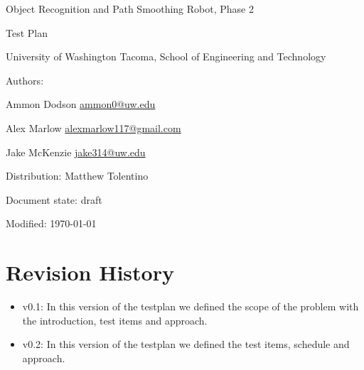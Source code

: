 \documentclass[english,12pt]{article}
\begin{document}
\begin{center}

\thispagestyle{empty}

$ $

\vspace{250pt}

\begin{bfseries}

{\Large Object Recognition and Path Smoothing Robot, Phase 2}

{\Huge Test Plan}


\end{bfseries}

\vspace{180pt}

University of Washington Tacoma, School of Engineering and Technology


\vspace{12pt}

Authors: 

Ammon Dodson \href{mailto:ammon0@uw.edu}{ammon0@uw.edu} 

Alex Marlow \href{mailto:alexmarlow117@gmail.com}{alexmarlow117@gmail.com} 

Jake McKenzie \href{mailto:jake314@uw.edu}{jake314@uw.edu}

Distribution: Matthew Tolentino

Document state: draft

Modified: \today

\end{center}

\newpage


\tableofcontents

\newpage


\section{Revision History}

\begin{itemize}
	\item v0.1: In this version of the testplan we defined the  
    scope of the problem with the introduction, test items and 
    approach.
    \item v0.2: In this version of the testplan we defined the  
    test items, schedule and approach.
\end{itemize}
\end{document}
